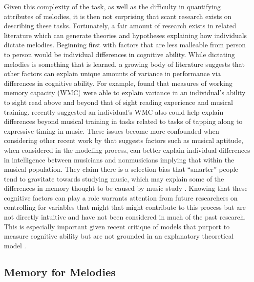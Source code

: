 \documentclass[]{book}
\begin{document}
Given this complexity of the task, as well as the difficulty in quantifying attributes of melodies, it is then not surprising that scant research exists on describing these tasks.
Fortunately, a fair amount of research exists in related literature which can generate theories and hypotheses explaining how individuals dictate melodies.
Beginning first with factors that are less malleable from person to person would be individual differences in cognitive ability.
While dictating melodies is something that is learned, a growing body of literature suggests that other factors can explain
unique amounts of variance in performance via differences in cognitive ability.
For example, \citet{meinzDeliberatePracticeNecessary2010} found that measures of working memory capacity (WMC)
were able to explain variance in an individual's ability to sight read above and beyond that of sight reading experience and
musical training.
\citep{colleyWorkingMemoryAuditory2017} recently suggested an individual's WMC also could help explain differences beyond musical training in tasks related to tasks of tapping along to expressive timing in music.
These issues become more confounded when considering other recent work by \citet{swaminathanRevisitingAssociationMusic2017} that suggests factors such as musical aptitude, when considered in the modeling process, can better explain individual differences in intelligence between musicians and nonmusicians implying that within the musical population.
They claim there is a selection bias that ``smarter'' people tend to gravitate towards studying music, which may explain some of the differences in memory thought to be caused by music study \citep{talaminiMusiciansHaveBetter2017}.
Knowing that these cognitive factors can play a role warrants attention from future researchers on controlling for variables that might that might contribute to this process but are not directly intuitive and have not been considered in much of the past
research.
This is especially important given recent critique of models that purport to measure cognitive ability but are not grounded in an explanatory theoretical model \citep{kovacsProcessOverlapTheory2016}.

\hypertarget{memory-for-melodies-1}{%
\subsection{Memory for Melodies}\label{memory-for-melodies-1}}
\end{document}
